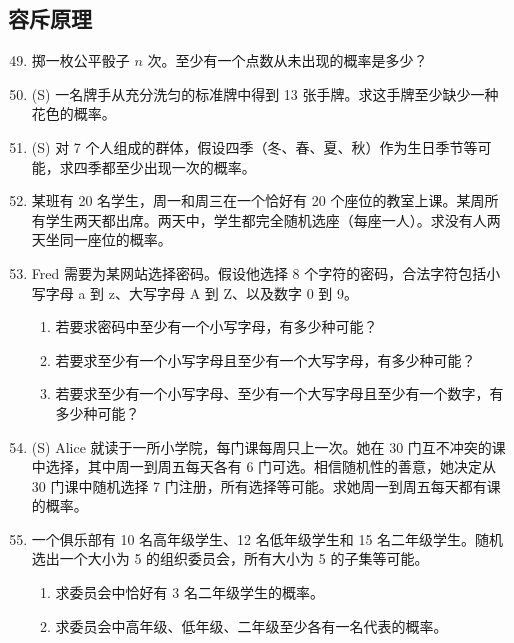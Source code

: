 \documentclass[UTF8,12pt,a4paper,fontset=fandol]{ctexart}
\begin{document}
\subsection*{容斥原理}

\begin{enumerate}
  \setcounter{enumi}{48}
  \item 掷一枚公平骰子 $n$ 次。至少有一个点数从未出现的概率是多少？

  \item (S) 一名牌手从充分洗匀的标准牌中得到 13 张手牌。求这手牌至少缺少一种花色的概率。

  \item (S) 对 7 个人组成的群体，假设四季（冬、春、夏、秋）作为生日季节等可能，求四季都至少出现一次的概率。

  \item 某班有 20 名学生，周一和周三在一个恰好有 20 个座位的教室上课。某周所有学生两天都出席。两天中，学生都完全随机选座（每座一人）。求没有人两天坐同一座位的概率。

  \item Fred 需要为某网站选择密码。假设他选择 8 个字符的密码，合法字符包括小写字母 a 到 z、大写字母 A 到 Z、以及数字 0 到 9。
  \begin{enumerate}
    \item 若要求密码中至少有一个小写字母，有多少种可能？
    \item 若要求至少有一个小写字母且至少有一个大写字母，有多少种可能？
    \item 若要求至少有一个小写字母、至少有一个大写字母且至少有一个数字，有多少种可能？
  \end{enumerate}

  \item (S) Alice 就读于一所小学院，每门课每周只上一次。她在 30 门互不冲突的课中选择，其中周一到周五每天各有 6 门可选。相信随机性的善意，她决定从 30 门课中随机选择 7 门注册，所有选择等可能。求她周一到周五每天都有课的概率。

  \item 一个俱乐部有 10 名高年级学生、12 名低年级学生和 15 名二年级学生。随机选出一个大小为 5 的组织委员会，所有大小为 5 的子集等可能。
  \begin{enumerate}
    \item 求委员会中恰好有 3 名二年级学生的概率。
    \item 求委员会中高年级、低年级、二年级至少各有一名代表的概率。
  \end{enumerate}
\end{enumerate}
\end{document}
